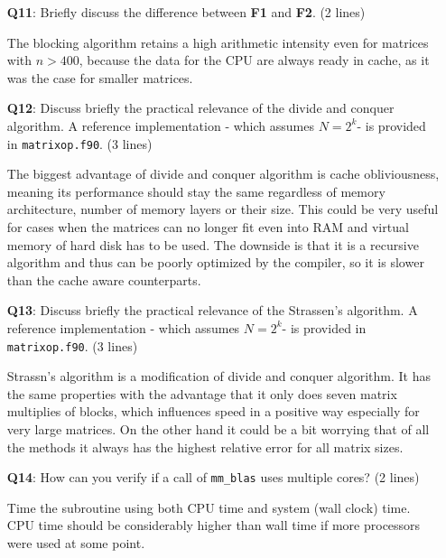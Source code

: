 \documentclass[a4paper]{article}
\newcommand{\answer}[1]{\vspace{-0.75em}\begin{framed} #1 \end{framed}\vspace{-0.75em}}
\begin{document}
\begin{itemize}
	\item[\textbf{Q11}:] Briefly discuss the difference between \textbf{F1} and \textbf{F2}. (2 lines)
	\answer{
	The blocking algorithm retains a high arithmetic intensity even for matrices with $ n>400 $, because the data for the CPU are always ready in cache, as it was the case for smaller matrices.
}
	\item[\textbf{Q12}:] Discuss briefly the practical relevance of the divide and conquer algorithm. A reference implementation - which assumes  $N=2^k$- is provided in \texttt{matrixop.f90}. (3 lines)
	\answer{
	The biggest advantage of divide and conquer algorithm is cache obliviousness, meaning its performance should stay the same regardless of memory architecture, number of memory layers or their size. This could be very useful for cases when the matrices can no longer fit even into RAM and virtual memory of hard disk has to be used. The downside is that it is a recursive algorithm and thus can be poorly optimized by the compiler, so it is slower than the cache aware counterparts.
}
	\item[\textbf{Q13}:] Discuss briefly the practical relevance of the Strassen's algorithm. A reference implementation - which assumes  $N=2^k$- is provided in \texttt{matrixop.f90}. (3 lines)
	\answer{
	Strassn's algorithm is a modification of divide and conquer algorithm. It has the same properties with the advantage that it only does seven matrix multiplies of blocks, which influences speed in a positive way especially for very large matrices. On the other hand it could be a bit worrying that of all the methods it always has the highest relative error for all matrix sizes.
}
	\item[\textbf{Q14}:] How can you verify if a call of \texttt{mm\_blas} uses multiple cores? (2 lines)
	\answer{Time the subroutine using both CPU time and system (wall clock) time. CPU time should be considerably higher than wall time if more processors were used at some point. }
\end{itemize}
\end{document}
